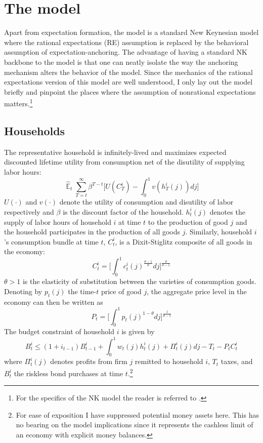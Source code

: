 \documentclass[11pt]{article}
\renewcommand{\[}{\begin{equation}}
\renewcommand{\]}{\end{equation}}
\DeclareMathOperator{\E}{\mathbb{E}}
\begin{document}
\section{The model}\label{NK}
Apart from expectation formation, the model is a standard New Keynesian model where the rational expectations (RE) assumption is replaced by the behavioral assumption of expectation-anchoring. The advantage of having a standard NK backbone to the model is that one can neatly isolate the way the anchoring mechanism alters the behavior of the model. Since the mechanics of the rational expectations version of this model are well understood, I only lay out the model briefly and pinpoint the places where the assumption of nonrational expectations matters.\footnote{For the specifics of the NK model the reader is referred to \cite{woodford2011interest}.}
\subsection{Households}
The representative household is infinitely-lived and maximizes expected discounted lifetime utility from consumption net of the disutility of supplying labor hours:
\begin{equation}
\hat{\E}_t\sum^{\infty}_{T=t}\beta^{T-t} \bigg[ U(C^i_T) - \int_0^1 v(h^i_T(j)) dj \bigg]
\label{lifetime_U}
\end{equation}
$U(\cdot)$ and $v(\cdot)$ denote the utility of consumption and disutility of labor respectively and $\beta$ is the discount factor of the household. $h^i_t(j)$ denotes the supply of labor hours of household $i$ at time $t$ to the production of good $j$ and the household participates in the production of all goods $j$. Similarly, household $i$'s consumption bundle at time $t$,  $C_t^i$, is a Dixit-Stiglitz composite of all goods in the economy:
\begin{equation}
C^i_t =  \bigg[  \int_0^1 c^i_t(j)^{\frac{\theta-1}{\theta}} dj \bigg]^{\frac{\theta}{\theta-1}}\label{dixit}
\end{equation}
$\theta>1$ is the elasticity of substitution between the varieties of consumption goods. Denoting by $p_t(j)$ the time-$t$ price of good $j$, the aggregate price level in the economy can then be written as
\begin{equation}
P_t =  \bigg[  \int_0^1 p_t(j)^{1-\theta} dj \bigg]^{\frac{1}{\theta-1}}
\label{agg_price}
\end{equation}
The budget constraint of household $i$ is given by
\begin{equation}
 B^i_t \leq (1+i_{t-1})B^i_{t-1} + \int_0^1 w_t(j)h^i_t(j) + \Pi_t^i(j)  dj-T_t -P_tC^i_t
 \label{BC}
\end{equation}
where $\Pi_t^i(j)$ denotes profits from firm $j$ remitted to household $i$, $T_t$ taxes, and $B^i_t$ the riskless bond purchases at time $t$.\footnote{For ease of exposition I have suppressed potential money assets here. This has no bearing on the model implications since it represents the cashless limit of an economy with explicit money balances.}
\end{document}
